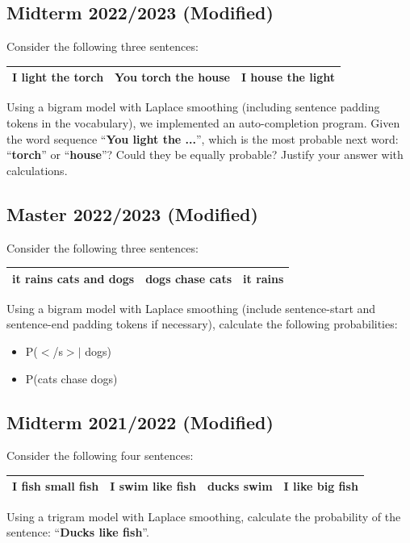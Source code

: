 \documentclass{../extra/aakpract/aakpract}
\begin{document}
	\subsection{Midterm 2022/2023 (Modified)}
	
	Consider the following three sentences:
	\begin{center}
		\begin{tabular}{|l|l|l|}
			\hline
			I light the torch &
			You torch the house &
			I house the light \\
			\hline
		\end{tabular}
	\end{center}
	
	Using a bigram model with Laplace smoothing (including sentence padding tokens in the vocabulary), we implemented an auto-completion program.  
%	
	Given the word sequence ``\textbf{You light the ...}'', which is the most probable next word: ``\textbf{torch}'' or ``\textbf{house}''? Could they be equally probable? Justify your answer with calculations.
	
	\subsection{Master 2022/2023 (Modified)}
	
	Consider the following three sentences:
	\begin{center}
		\begin{tabular}{|l|l|l|}
			\hline
			it rains cats and dogs &
			dogs chase cats &
			it rains \\
			\hline
		\end{tabular}
	\end{center}
	
	Using a bigram model with Laplace smoothing (include sentence-start and sentence-end padding tokens if necessary), calculate the following probabilities:
	\begin{itemize}
		\item P($<$/s$>|$ dogs)
		\item P(cats chase dogs)
	\end{itemize}
	
	\subsection{Midterm 2021/2022 (Modified)}
	
	Consider the following four sentences:
	\begin{center}
		\begin{tabular}{|l|l|l|l|}
			\hline
			I fish small fish &
			I swim like fish &
			ducks swim &
			I like big fish \\
			\hline
		\end{tabular}
	\end{center}
	

	Using a trigram model with Laplace smoothing, calculate the probability of the sentence: ``\textbf{Ducks like fish}''.
	
	
\end{document}
